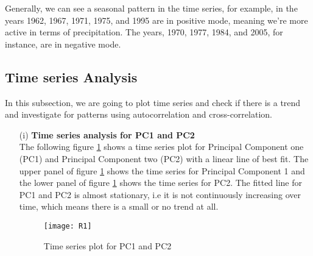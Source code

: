\documentclass[12pt,a4paper]{article}
\begin{document}
Generally, we can see a seasonal pattern in the time series, for example, in the years 1962, 1967, 1971, 1975, and 1995 are in positive mode, meaning we're more active in terms of precipitation. The years, 1970, 1977, 1984, and 2005, for instance, are in negative mode.

\subsection{Time series Analysis}
In this subsection, we are going to plot time series and check if there is a trend and investigate for patterns using autocorrelation and cross-correlation.
\begin{enumerate}
\item[(i)]\textbf{Time series analysis for PC1 and PC2}\\
The following figure \ref{fig 16} shows a time series plot for Principal Component one (PC1) and Principal Component two (PC2) with a linear line of best fit. The upper panel of figure  \ref{fig 16} shows the time series for Principal Component 1 and the lower panel of figure  \ref{fig 16} shows the time series for PC2. The fitted line for PC1 and PC2 is almost stationary, i.e it is not continuously increasing over time, which means there is a small or no trend at all. 
\begin{figure}[H]
\texttt{[image: R1]}
\centering
\caption{Time series plot for PC1 and PC2}
\label{fig 16}
\end{figure}


\end{enumerate}
\end{document}
